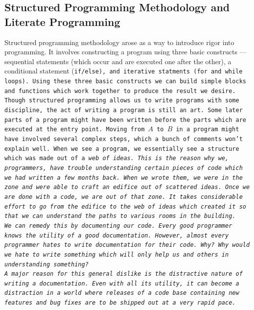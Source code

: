\subsection{Structured Programming Methodology and Literate Programming}

Structured programming methodology arose as a way to introduce rigor into programming. It involves
constructing a program using three basic constructs --- sequential statements (which occur and are executed
one after the other), a conditional statement (\tt if\rm/\tt else\rm), and iterative statments (\tt for \rm
and \tt while \rm loops). Using these three basic constructs we can build simple blocks and functions which
work together to produce the result we desire.\\

Though structured programming allows us to write programs with some discipline, the act of writing a program
is still an art. Some later parts of a program might have been written before the parts which are executed at
the entry point. Moving from $A$ to $B$ in a program might have involved several complex steps, which a bunch
of comments won't explain well. When we see a program, we essentially see a structure which was made out of a
\it web \rm of ideas. This is the reason why we, programmers, have trouble understanding certain pieces of
code which we had written a few months back. When we wrote them, we were in the \it zone \rm and were able to
craft an edifice out of scattered ideas. Once we are done with a code, we are out of that zone. It takes
considerable effort to go from the edifice to the \it web \rm of ideas which created it so that we can
understand the paths to various rooms in the building.\\

We can remedy this by documenting our code. Every good programmer knows the utility of a good documentation.
However, almost every programmer hates to write documentation for their code. Why? Why would we hate to write
something which will only help us and others in understanding something?\\

A major reason for this general dislike is the distractive nature of writing a documentation. Even with all
its utility, it can become a distraction in a world where releases of a code base containing new features and
bug fixes are to be shipped out at a very rapid pace.\\


